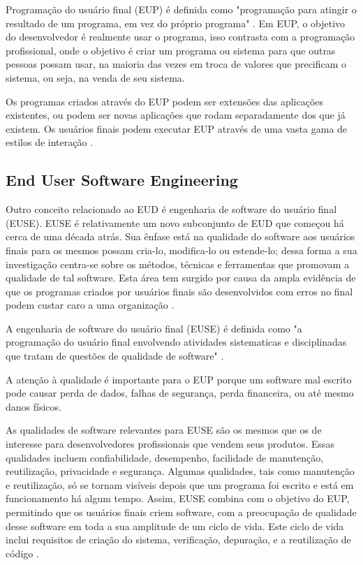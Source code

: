 Programação do usuário final (EUP) é definida como "programação para atingir o resultado de um programa, em vez do próprio programa" \cite{ko2011state}. Em EUP, o objetivo do desenvolvedor é realmente usar o programa, isso contrasta com a programação profissional, onde o objetivo é criar um programa ou sistema para que outras pessoas possam usar, na maioria das vezes em troca de valores que precificam o sistema, ou seja, na venda de seu sistema.

Os programas criados através do EUP podem ser extensões das aplicações existentes, ou podem ser novas aplicações que rodam separadamente dos que já existem. Os usuários finais podem executar EUP através de uma vasta gama de estilos de interação \cite{nardi1993small}.

\subsection{End User Software Engineering}

Outro conceito relacionado ao EUD é engenharia de software do usuário final (EUSE). EUSE é relativamente um novo subconjunto de EUD que começou há cerca de uma década atrás. Sua ênfase está na qualidade do software aos usuários finais para os mesmos possam cria-lo, modifica-lo ou estende-lo; dessa forma a sua investigação centra-se sobre os métodos, técnicas e ferramentas que promovam a qualidade de tal software. Esta área tem surgido por causa da ampla evidência de que os programas criados por usuários finais são desenvolvidos com erros no final podem custar caro a uma organização \cite{panko1998we,burnett2010technology,ko2011state}.

A engenharia de software do usuário final (EUSE) é definida como "a programação do usuário final envolvendo atividades sistematicas e disciplinadas que tratam de questões de qualidade de software" \cite{ko2011state}.

A atenção à qualidade é importante para o EUP porque um software mal escrito pode causar perda de dados, falhas de segurança, perda financeira, ou até mesmo danos físicos.

As qualidades de software relevantes para EUSE são os mesmos que os de interesse para desenvolvedores profissionais que vendem seus produtos. Essas qualidades incluem confiabilidade, desempenho, facilidade de manutenção, reutilização, privacidade e segurança. Algumas qualidades, tais como manutenção e reutilização, só se tornam visíveis depois que um programa foi escrito e está em funcionamento há algum tempo. Assim, EUSE combina com o objetivo do EUP, permitindo que os usuários finais criem software, com a preocupação de qualidade desse software em toda a sua amplitude de um ciclo de vida. Este ciclo de vida inclui requisitos de criação do sistema, verificação, depuração, e a reutilização de código \cite{ko2011state}.

